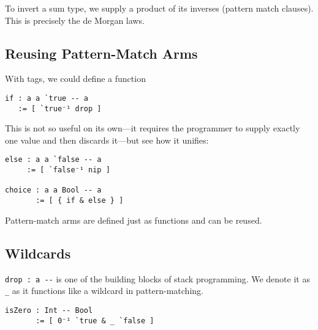 \documentclass{article}
\begin{document}
To invert a sum type, we supply a product of its inverses (pattern match clauses). This is precisely the de Morgan laws.



\subsection{Reusing Pattern-Match Arms}

With tags, we could define a function

\begin{verbatim}
if : a a `true -- a
   := [ `true⁻¹ drop ]
\end{verbatim}

This is not so useful on its own---it requires the programmer to supply exactly one value and then discards it---but see how it unifies:

\begin{verbatim}
else : a a `false -- a
     := [ `false⁻¹ nip ]

choice : a a Bool -- a
       := [ { if & else } ]
\end{verbatim}

Pattern-match arms are defined just as functions and can be reused. %


\subsection{Wildcards}

\verb|drop : a --| is one of the building blocks of stack programming. We denote it as \verb|_| as it functions like a wildcard in pattern-matching.

\begin{verbatim}
isZero : Int -- Bool
       := [ 0⁻¹ `true & _ `false ]
\end{verbatim}
\end{document}
